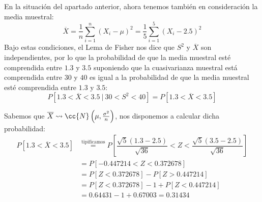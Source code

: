 \begin{ejercicio}
\begin{enumerate}[label=\alph*)]
            En la situación del apartado anterior, ahora tenemos también en consideración la media muestral:
            \begin{equation*}
                \overline{X} = \dfrac{1}{n}\sum_{i=1}^n {(X_i -\mu)}^{2} = \dfrac{1}{5}\sum_{i=1}^{5}{(X_i - 2.5)}^{2}
            \end{equation*} 
            Bajo estas condiciones, el Lema de Fisher nos dice que $S^2$ y $\overline{X}$ son independientes, por lo que la probabilidad de que la media muestral esté comprendida entre $1.3$ y $3.5$ suponiendo que la cuasivarianza muestral está comprendida entre $30$ y $40$ es igual a la probabilidad de que la media muestral esté comprendida entre $1.3$ y $3.5$:
            \begin{equation*}
                P[1.3<\overline{X}<3.5\ |\ 30 < S^2 < 40] = P[1.3<\overline{X}<3.5]
            \end{equation*}

            Sabemos que $\overline{X}\rightsquigarrow\cc{N}\left(\mu, \frac{\sigma^2}{n}\right)$, nos disponemos a calcular dicha probabilidad:
            \begin{align*}
                P[1.3<\overline{X}<3.5] &\stackrel{\text{tipificamos}}{=} P\left[\dfrac{\sqrt{5}(1.3-2.5)}{\sqrt{36}}< Z < \dfrac{\sqrt{5}(3.5-2.5)}{\sqrt{36}}\right] \\
                                        &= P[-0.447214 < Z < 0.372678] \\ 
                                        &= P[Z<0.372678] - P[Z>0.447214] \\
                                        &= P[Z<0.372678] -1 + P[Z<0.447214] \\
                                        &= 0.64431 - 1 + 0.67003 = 0.31434
            \end{align*}
    \end{enumerate}
\end{ejercicio}

